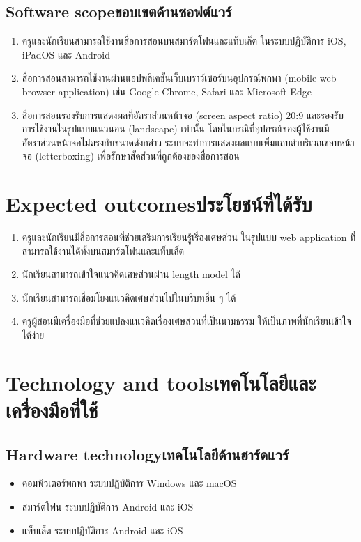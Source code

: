 \subsection{\ifenglish Software scope\else ขอบเขตด้านซอฟต์แวร์\fi}
\begin{enumerate}
    \item ครูและนักเรียนสามารถใช้งานสื่อการสอนบนสมาร์ตโฟนและแท็บเล็ต ในระบบปฏิบัติการ iOS, \\iPadOS และ Android
    \item สื่อการสอนสามารถใช้งานผ่านแอปพลิเคชันเว็บเบราว์เซอร์บนอุปกรณ์พกพา (mobile web browser application) เช่น Google Chrome, Safari และ Microsoft Edge
    \item สื่อการสอนรองรับการแสดงผลที่อัตราส่วนหน้าจอ (screen aspect ratio) 20:9 และรองรับการใช้งานในรูปแบบแนวนอน (landscape) เท่านั้น 
    โดยในกรณีที่อุปกรณ์ของผู้ใช้งานมีอัตราส่วนหน้าจอไม่ตรงกับขนาดดังกล่าว ระบบจะทำการแสดงผลแบบเพิ่มแถบดำบริเวณขอบหน้าจอ (letterboxing) เพื่อรักษาสัดส่วนที่ถูกต้องของสื่อการสอน
\end{enumerate}

\section{\ifenglish Expected outcomes\else ประโยชน์ที่ได้รับ\fi}
\begin{enumerate}
    \item ครูและนักเรียนมีสื่อการสอนที่ช่วยเสริมการเรียนรู้เรื่องเศษส่วน ในรูปแบบ web application ที่สามารถใช้งานได้ทั้งบนสมาร์ตโฟนและแท็บเล็ต
    \item นักเรียนสามารถเข้าใจแนวคิดเศษส่วนผ่าน length model ได้
    \item นักเรียนสามารถเชื่อมโยงแนวคิดเศษส่วนไปในบริบทอื่น ๆ ได้
    \item ครูผู้สอนมีเครื่องมือที่ช่วยแปลงแนวคิดเรื่องเศษส่วนที่เป็นนามธรรม ให้เป็นภาพที่นักเรียนเข้าใจได้ง่าย
\end{enumerate}

\section{\ifenglish Technology and tools\else เทคโนโลยีและเครื่องมือที่ใช้\fi}

\subsection{\ifenglish Hardware technology\else เทคโนโลยีด้านฮาร์ดแวร์\fi}
\begin{itemize}
    \item คอมพิวเตอร์พกพา ระบบปฏิบัติการ Windows และ macOS
    \item สมาร์ตโฟน ระบบปฏิบัติการ Android และ iOS
    \item แท็บเล็ต ระบบปฏิบัติการ Android และ iOS
\end{itemize}

